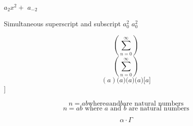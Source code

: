 \documentclass[10pt]{article}
\begin{document}
	\(a_2 x^2 + \) 
	\(a_{-2}\)  
	
	Simultaneous superscript and subscript
	\(a^2_0\)
	\(a_0^2\)
	
	
	\[
	(\sum_{n=0}^{\infty})
	\]
	\[
	\left(\sum_{n=0}^{\infty}\right)
	\]
	\[
		(a)
		\big( a \big)
		\Big( a \Big)
		\bigg( a \bigg)
		\Bigg[ a \Bigg]
	\]]
	
	\[
		n = ab \text{where} a \text{and} b \text{are natural numbers}
	\]
	\[
	n = ab \text{ where } a \text{ and } b \text{ are natural numbers}
	\]
	
	\[
		\alpha \cdot \Gamma
	\]
	
	
\end{document}
